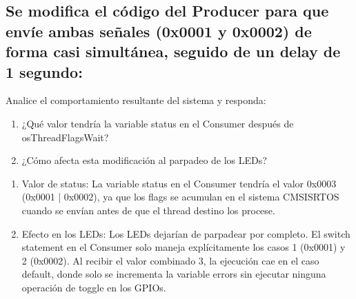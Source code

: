 \documentclass[letterpaper,10pt,english]{sphinxmanual}
\begin{document}
\subsection{Se modifica el código del Producer para que envíe ambas señales (0x0001 y 0x0002) de forma casi simultánea, seguido de un delay de 1 segundo:}
\label{\detokenize{ejemplothreads-flags:se-modifica-el-codigo-del-producer-para-que-envie-ambas-senales-0x0001-y-0x0002-de-forma-casi-simultanea-seguido-de-un-delay-de-1-segundo}}
\begin{sphinxVerbatim}[commandchars=\\\{\},numbers=left,firstnumber=1,stepnumber=1]
\end{sphinxVerbatim}

\sphinxAtStartPar
Analice el comportamiento resultante del sistema y responda:
\begin{enumerate}
%
\item {} 
\sphinxAtStartPar
¿Qué valor tendría la variable status en el Consumer después de osThreadFlagsWait?

\item {} 
\sphinxAtStartPar
¿Cómo afecta esta modificación al parpadeo de los LEDs?

\end{enumerate}
\begin{enumerate}
%
\item {} 
\sphinxAtStartPar
Valor de status: La variable status en el Consumer tendría el valor 0x0003 (0x0001 | 0x0002), ya que los flags se acumulan en el sistema CMSIS\sphinxhyphen{}RTOS cuando se envían antes de que el thread destino los procese.

\item {} 
\sphinxAtStartPar
Efecto en los LEDs: Los LEDs dejarían de parpadear por completo. El switch statement en el Consumer solo maneja explícitamente los casos 1 (0x0001) y 2 (0x0002). Al recibir el valor combinado 3, la ejecución cae en el caso default, donde solo se incrementa la variable errors sin ejecutar ninguna operación de toggle en los GPIOs.

\end{enumerate}
\end{document}
